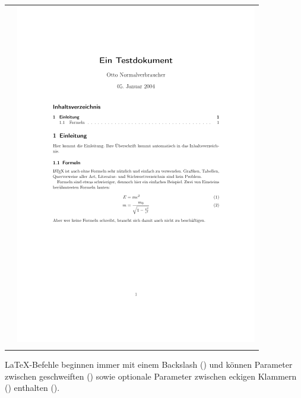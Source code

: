 \begin{tabular}{c|c}
\begin{minipage}[b]{\textwidth/2}
\begin{lstlisting}
\end{lstlisting}
\end{minipage}
&
\begin{minipage}[t]{\textwidth/2}

		\includegraphics[width=\linewidth]{output}

\end{minipage}\\
\label{tab:codeOutput}
\end{tabular} 

LaTeX-Befehle beginnen immer mit einem Backslash (\ybox{$\backslash$}) und können Parameter zwischen geschweiften (\ybox{\{\}}) sowie optionale Parameter zwischen eckigen Klammern (\ybox{$\backslash$[$\backslash$]}) enthalten ().

